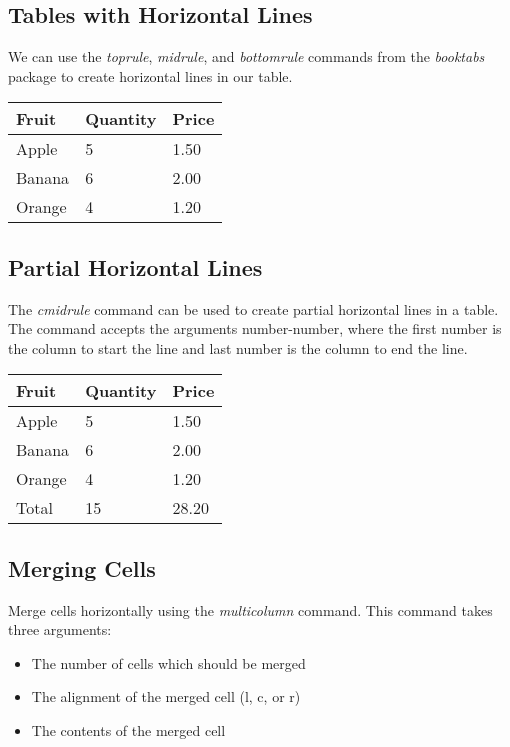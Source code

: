 \documentclass{article}
\newcommand{\cmd}[1]{\textit{#1}}
\begin{document}
\subsection{Tables with Horizontal Lines}

We can use the \cmd{toprule}, \cmd{midrule}, and \cmd{bottomrule} commands from the \cmd{booktabs}
package to create horizontal lines in our table.

\begin{tabular}{*{3}{l}}
  \toprule
  Fruit  & Quantity & Price \\
  \midrule
  Apple  & 5        & 1.50  \\
  Banana & 6        & 2.00  \\
  Orange & 4        & 1.20  \\
  \bottomrule
\end{tabular}

\subsection{Partial Horizontal Lines}

The \cmd{cmidrule} command can be used to create partial horizontal lines in a table. The command
accepts the arguments {number-number}, where the first number is the column to start the line and
last number is the column to end the line.

\begin{tabular}{*{3}{l}}
  \toprule
  Fruit  & Quantity &  Price \\
  \midrule
  Apple  & 5        &  1.50  \\
  Banana & 6        &  2.00  \\
  Orange & 4        &  1.20  \\
  \cmidrule{3-3}
  Total & 15        & 28.20  \\
  \bottomrule
\end{tabular}

\subsection{Merging Cells}

Merge cells horizontally using the \cmd{multicolumn} command. This command takes three arguments:

\begin{itemize}
  \item The number of cells which should be merged
  \item The alignment of the merged cell (l, c, or r)
  \item The contents of the merged cell
\end{itemize}
\end{document}
